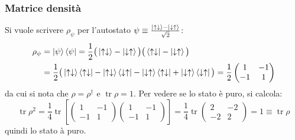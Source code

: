 \documentclass[10pt, a4paper]{scrartcl} %
\numberwithin{equation}{subsection}
\theoremstyle{style2}
\theoremstyle{style1}
\begin{document}
\subsubsection{Matrice densit\`a}
Si vuole scrivere $\rho _\psi $ per l'autostato $\psi \equiv \frac{\ket{\uparrow \downarrow} - \ket{\downarrow\uparrow} }{\sqrt{2} } $:
\begin{equation}
	\begin{split}
		\rho _\psi  &= \ket{\psi } \bra{\psi } = \frac{1}{2} \big(\ket{\uparrow\downarrow} - \ket{\downarrow\uparrow} \big) \big( \bra{\uparrow\downarrow} - \ket{\downarrow\uparrow}  \big) \\
			    &= \frac{1}{2} \big(\ket{\uparrow \downarrow} \bra{\uparrow \downarrow} - \ket{\uparrow \downarrow} \bra{\downarrow\uparrow} - \ket{\downarrow\uparrow} \bra{\uparrow\downarrow}  + \ket{\downarrow \uparrow} \bra{\downarrow\uparrow} \big)=  \frac{1}{2} \begin{pmatrix} 1 & - 1 \\ -1 & 1 \end{pmatrix} 
	\end{split}
\end{equation}
da cui si nota che $\rho  =  \rho ^\dagger $ e $\operatorname{tr} \rho  = 1$. 
Per vedere se lo stato \`e puro, si calcola:
\begin{equation}
	\operatorname{tr} \rho ^2 = \frac{1}{4} \operatorname{tr} \left[ \begin{pmatrix} 1 & - 1 \\ -1 & 1 \end{pmatrix} \begin{pmatrix} 1 & - 1 \\ -1 &1 \end{pmatrix}  \right] = \frac{1}{4} \operatorname{tr}  \begin{pmatrix} 2 & - 2 \\ -2 & 2 \end{pmatrix} = 1 \equiv \operatorname{tr} \rho 
\end{equation}
quindi lo stato \`a puro. 
\end{document}
